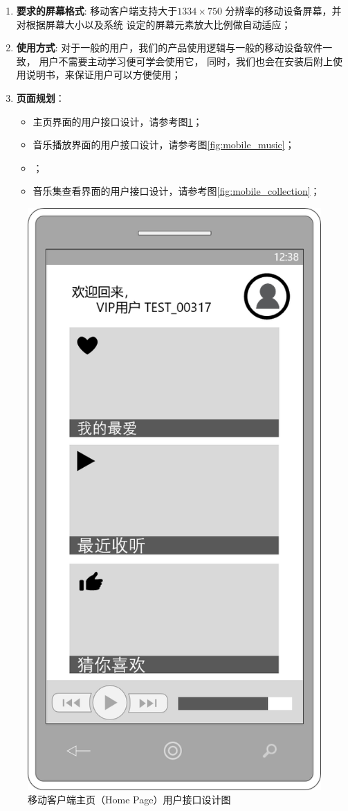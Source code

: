 \begin{enumerate}
	\item \textbf{要求的屏幕格式}:
		移动客户端支持大于$1334 \times 750$ 分辨率的移动设备屏幕，并对根据屏幕大小以及系统
		设定的屏幕元素放大比例做自动适应；
	\item \textbf{使用方式}:
		对于一般的用户，我们的产品使用逻辑与一般的移动设备软件一致，
			用户不需要主动学习便可学会使用它，
		同时，我们也会在安装后附上使用说明书，来保证用户可以方便使用；
	\item \textbf{页面规划}： 
	\begin{itemize}
		\item 主页界面的用户接口设计，请参考图\ref{fig:mobile_home}；
		\item 音乐播放界面的用户接口设计，请参考图\ref{fig:mobile_music}；
		\item {}；
		\item 音乐集查看界面的用户接口设计，请参考图\ref{fig:mobile_collection}；
	\end{itemize}
\end{enumerate}

\begin{figure}[h!]
  \centering

  \includegraphics[width=.33\linewidth]{figures/mobile_home}

  \caption{  \label{fig:mobile_home}
  		移动客户端主页（Home Page）用户接口设计图
    }
\end{figure}


